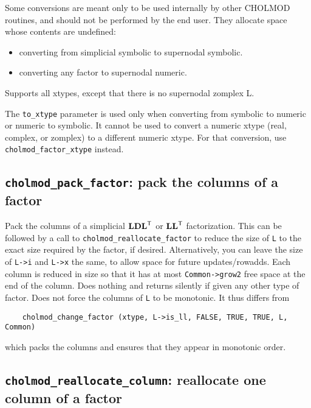\documentclass[11pt]{article}
\newcommand{\m}[1]{{\bf{#1}}}       %
\newcommand{\tr}{^{\sf T}}          %
\begin{document}
Some conversions are meant only to be used internally by other CHOLMOD
routines, and should not be performed by the end user.  They allocate space
whose contents are undefined:

\begin{itemize}
\item converting from simplicial symbolic to supernodal symbolic.
\item converting any factor to supernodal numeric.
\end{itemize}

Supports all xtypes, except that there is no supernodal zomplex L.

The {\tt to\_xtype} parameter is used only when converting from symbolic to numeric
or numeric to symbolic.  It cannot be used to convert a numeric xtype (real,
complex, or zomplex) to a different numeric xtype.  For that conversion,
use {\tt cholmod\_factor\_xtype} instead.

\newpage \subsection{{\tt cholmod\_pack\_factor}: pack the columns of a factor}


Pack the columns of a simplicial $\m{LDL}\tr$ or $\m{LL}\tr$ factorization.  This can be followed
by a call to {\tt cholmod\_reallocate\_factor} to reduce the size of {\tt L} to the exact
size required by the factor, if desired.  Alternatively, you can leave the
size of {\tt L->i} and {\tt L->x} the same, to allow space for future updates/rowadds.
Each column is reduced in size so that it has at most {\tt Common->grow2} free
space at the end of the column.
Does nothing and returns silently if given any other type of factor.
Does not force the columns of {\tt L} to be monotonic.  It thus differs from
\begin{verbatim}
    cholmod_change_factor (xtype, L->is_ll, FALSE, TRUE, TRUE, L, Common)
\end{verbatim}
which packs the columns and ensures that they appear in monotonic order.

\subsection{{\tt cholmod\_reallocate\_column}: reallocate one column of a factor}
\end{document}
